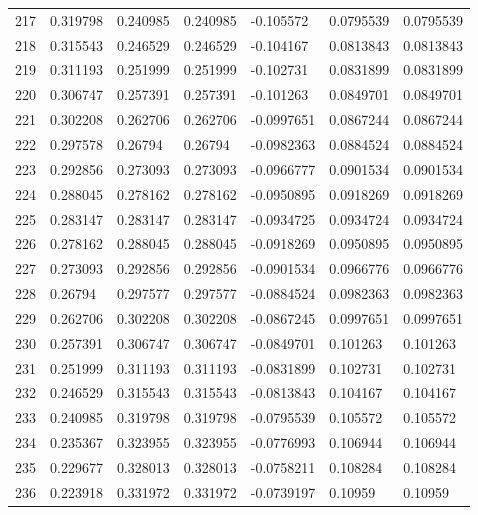 \begin{longtable}{l|lll|lll}
 217 &  0.319798    & 0.240985    & 0.240985    & -0.105572    & 0.0795539   & 0.0795539   \\
 218 &  0.315543    & 0.246529    & 0.246529    & -0.104167    & 0.0813843   & 0.0813843   \\
 219 &  0.311193    & 0.251999    & 0.251999    & -0.102731    & 0.0831899   & 0.0831899   \\
 220 &  0.306747    & 0.257391    & 0.257391    & -0.101263    & 0.0849701   & 0.0849701   \\
 221 &  0.302208    & 0.262706    & 0.262706    & -0.0997651   & 0.0867244   & 0.0867244   \\
 222 &  0.297578    & 0.26794     & 0.26794     & -0.0982363   & 0.0884524   & 0.0884524   \\
 223 &  0.292856    & 0.273093    & 0.273093    & -0.0966777   & 0.0901534   & 0.0901534   \\
 224 &  0.288045    & 0.278162    & 0.278162    & -0.0950895   & 0.0918269   & 0.0918269   \\
 225 &  0.283147    & 0.283147    & 0.283147    & -0.0934725   & 0.0934724   & 0.0934724   \\
 226 &  0.278162    & 0.288045    & 0.288045    & -0.0918269   & 0.0950895   & 0.0950895   \\
 227 &  0.273093    & 0.292856    & 0.292856    & -0.0901534   & 0.0966776   & 0.0966776   \\
 228 &  0.26794     & 0.297577    & 0.297577    & -0.0884524   & 0.0982363   & 0.0982363   \\
 229 &  0.262706    & 0.302208    & 0.302208    & -0.0867245   & 0.0997651   & 0.0997651   \\
 230 &  0.257391    & 0.306747    & 0.306747    & -0.0849701   & 0.101263    & 0.101263    \\
 231 &  0.251999    & 0.311193    & 0.311193    & -0.0831899   & 0.102731    & 0.102731    \\
 232 &  0.246529    & 0.315543    & 0.315543    & -0.0813843   & 0.104167    & 0.104167    \\
 233 &  0.240985    & 0.319798    & 0.319798    & -0.0795539   & 0.105572    & 0.105572    \\
 234 &  0.235367    & 0.323955    & 0.323955    & -0.0776993   & 0.106944    & 0.106944    \\
 235 &  0.229677    & 0.328013    & 0.328013    & -0.0758211   & 0.108284    & 0.108284    \\
 236 &  0.223918    & 0.331972    & 0.331972    & -0.0739197   & 0.10959     & 0.10959     \\

\end{longtable}
